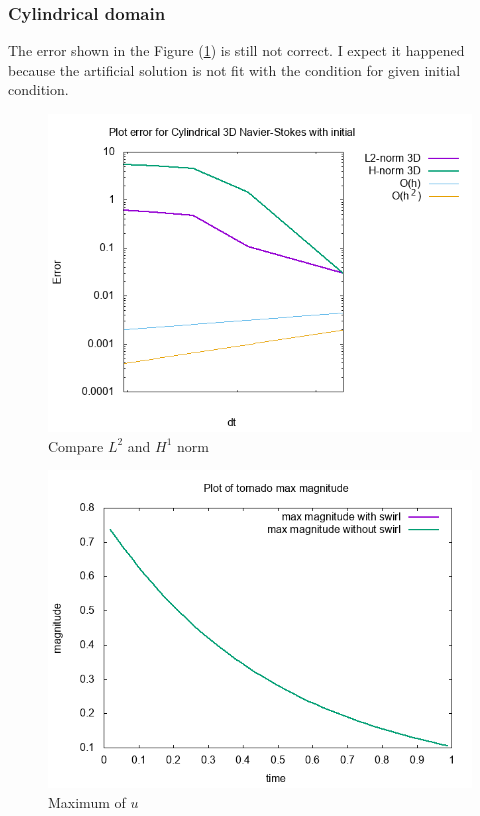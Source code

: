 \documentclass[a4paper]{article}
\begin{document}
\subsubsection{Cylindrical domain}
The error shown in the Figure (\ref{fig:errortornado}) is still not correct. I expect it happened because the artificial solution is not fit with the condition for given initial condition.
\begin{figure}[h!]
	\centering
	\includegraphics[width=1\linewidth]{NS_3D/error_tornado}
	\caption{Compare $ L^{2} $ and $ H^{1} $ norm}
	\label{fig:errortornado}
\end{figure}
\begin{figure}[h!]
	\centering
	\includegraphics[width=1\linewidth]{NS_3D/magnitude_tornado}
	\caption{Maximum of $ u $ }
	\label{fig:magnitudetornado}
\end{figure}
\end{document}
